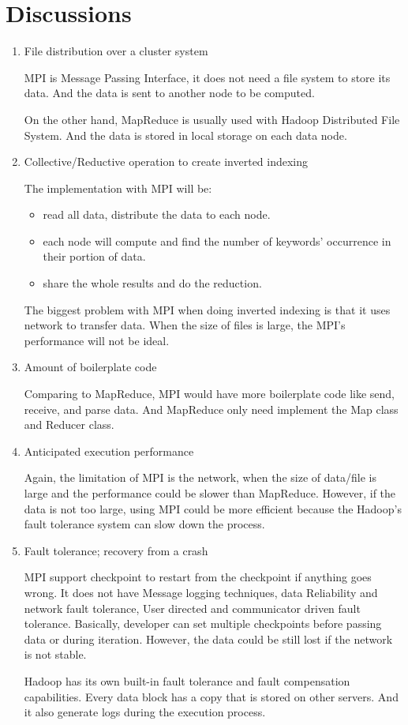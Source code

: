 \documentclass[11pt, letterpaper]{article}
\begin{document}
	\section {Discussions}
	
	\begin{enumerate} 
		\item File distribution over a cluster system\par
		MPI is Message Passing Interface, it does not need a file system to store its data. And the data is sent to another node to be computed. \par
		On the other hand, MapReduce is usually used with Hadoop Distributed File System. And the data is stored in local storage on each data node. 
		\item Collective/Reductive operation to create inverted indexing \par
		The implementation with MPI will be:
		\begin{itemize} 
			\item read all data, distribute the data to each node.
			\item each node will compute and find the number of keywords' occurrence in their portion of data.
			\item share the whole results and do the reduction.
		\end{itemize}
		The biggest problem with MPI when doing inverted indexing is that it uses network to transfer data. When the size of files is large, the MPI's performance will not be ideal.
		\item Amount of boilerplate code \par
		Comparing to MapReduce, MPI would have more boilerplate code like send, receive, and parse data. And MapReduce only need implement the Map class and Reducer class.
		\item Anticipated execution performance \par
		Again, the limitation of MPI is the network, when the size of data/file is large and the performance could be slower than MapReduce. However, if the data is not too large, using MPI could be more efficient because the Hadoop's fault tolerance system can slow down the process.
		\item Fault tolerance; recovery from a crash \par
		MPI support checkpoint to restart from the checkpoint if anything goes wrong. It does not have Message logging techniques, data Reliability and network fault tolerance, User directed and communicator driven fault tolerance. Basically, developer can set multiple checkpoints before passing data or during iteration. However, the data could be still lost if the network is not stable. \par
		Hadoop has its own built-in fault tolerance and fault compensation capabilities. Every data block has a copy that is stored on other servers. And it also generate logs during the execution process. 
		
	\end{enumerate}
	
\end{document}
